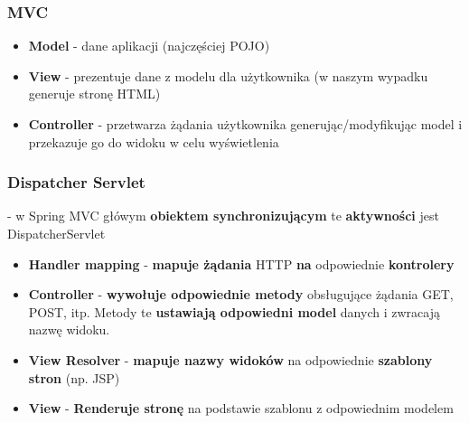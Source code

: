 \documentclass[../main.tex]{subfiles}
\begin{document}
    \subsubsection{MVC}
    \begin{itemize}
        \item \textbf{Model} - dane aplikacji (najczęściej POJO)
        \item \textbf{View} - prezentuje dane z modelu dla użytkownika (w naszym wypadku generuje
        stronę HTML)
        \item \textbf{Controller} - przetwarza żądania użytkownika generując/modyfikując model i przekazuje
        go do widoku w celu wyświetlenia
    \end{itemize}

    \subsubsection{Dispatcher Servlet} - w Spring MVC główym \textbf{obiektem synchronizującym} te \textbf{aktywności} jest
    DispatcherServlet
    \begin{itemize}
        \item \textbf{Handler mapping} - \textbf{mapuje żądania} HTTP \textbf{na} odpowiednie \textbf{kontrolery}
        \item \textbf{Controller} - \textbf{wywołuje odpowiednie metody} obsługujące żądania GET, POST, itp. Metody te
        \textbf{ustawiają odpowiedni model} danych i zwracają nazwę widoku.
        \item \textbf{View Resolver} - \textbf{mapuje nazwy widoków} na odpowiednie \textbf{szablony stron} (np. JSP)
        \item \textbf{View} - \textbf{Renderuje stronę} na podstawie szablonu z odpowiednim modelem
    \end{itemize}
\end{document}
